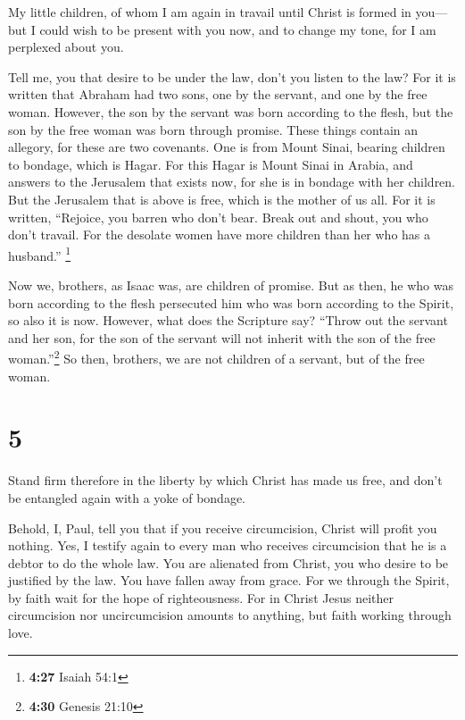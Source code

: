  My little children, of whom I am again in travail until
Christ is formed in you---  but I could wish to be
present with you now, and to change my tone, for I am perplexed about
you.

 Tell me, you that desire to be under the law, don't you
listen to the law?  For it is written that Abraham had
two sons, one by the servant, and one by the free woman. 
However, the son by the servant was born according to the flesh, but the
son by the free woman was born through promise.  These
things contain an allegory, for these are two covenants. One is from
Mount Sinai, bearing children to bondage, which is Hagar.
 For this Hagar is Mount Sinai in Arabia, and answers to
the Jerusalem that exists now, for she is in bondage with her children.
 But the Jerusalem that is above is free, which is the
mother of us all.  For it is written, ``Rejoice, you
barren who don't bear. Break out and shout, you who don't travail. For
the desolate women have more children than her who has a husband.''
\footnote{\textbf{4:27} Isaiah 54:1}

 Now we, brothers, as Isaac was, are children of promise.
 But as then, he who was born according to the flesh
persecuted him who was born according to the Spirit, so also it is now.
 However, what does the Scripture say? ``Throw out the
servant and her son, for the son of the servant will not inherit with
the son of the free woman.''\footnote{\textbf{4:30} Genesis 21:10}
 So then, brothers, we are not children of a servant, but
of the free woman.

\hypertarget{section-4}{%
\section{5}\label{section-4}}

 Stand firm therefore in the liberty by which Christ has
made us free, and don't be entangled again with a yoke of bondage.

 Behold, I, Paul, tell you that if you receive
circumcision, Christ will profit you nothing.  Yes, I
testify again to every man who receives circumcision that he is a debtor
to do the whole law.  You are alienated from Christ, you
who desire to be justified by the law. You have fallen away from grace.
 For we through the Spirit, by faith wait for the hope of
righteousness.  For in Christ Jesus neither circumcision
nor uncircumcision amounts to anything, but faith working through love.


